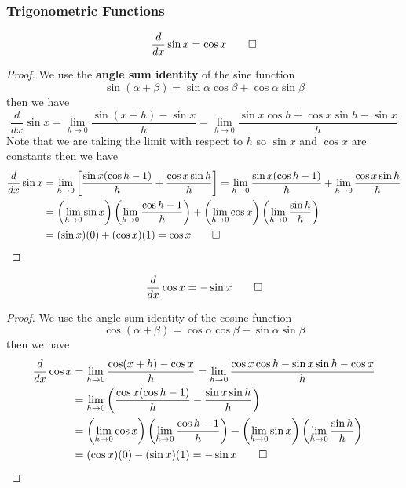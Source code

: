 \subsubsection{Trigonometric Functions}
\begin{theorem}
    \[\frac{d}{dx}\sin x=\cos x \qedhere\]
\end{theorem}
\begin{proof}
    We use the \textbf{angle sum identity} of the sine function
    \[\sin(\alpha+\beta)=\sin\alpha\cos\beta+\cos\alpha\sin\beta\]
    then we have
    \[\frac{d}{dx}\sin x=\lim_{h\to 0}\frac{\sin(x+h)-\sin x}{h}
    =\lim_{h\to 0}\frac{\sin x\cos h+\cos x\sin h-\sin x}{h}\]
    Note that we are taking the limit with respect to \(h\) so \(\sin x\) and
    \(\cos x\) are constants then we have
    \begin{align*}
        \frac{d}{dx}\sin x
        &= \lim_{h\to 0}\left[\frac{\sin x(\cos h-1)}{h}
        +\frac{\cos x\sin h}{h}\right]
        =\lim_{h\to 0}\frac{\sin x(\cos h-1)}{h}
        +\lim_{h\to 0}\frac{\cos x\sin h}{h}  \\
        &= \left(\lim_{h\to 0}\sin x\right)
        \left(\lim_{h\to 0}\frac{\cos h-1}{h}\right)
        +\left(\lim_{h\to 0}\cos x\right)
        \left(\lim_{h\to 0}\frac{\sin h}{h}\right)  \\
        &= (\sin x)(0)+(\cos x)(1) =\cos x \qedhere
    \end{align*}
\end{proof}
\begin{theorem}
    \[\frac{d}{dx}\cos x=-\sin x \qedhere\]
\end{theorem}
\begin{proof}
    We use the angle sum identity of the cosine function
    \[\cos(\alpha+\beta)=\cos\alpha\cos\beta-\sin\alpha\sin\beta\]
    then we have
    \begin{align*}
        \frac{d}{dx}\cos x
        &= \lim_{h\to 0}\frac{\cos(x+h)-\cos x}{h}
        =\lim_{h\to 0}\frac{\cos x\cos h-\sin x\sin h-\cos x}{h}  \\
        &= \lim_{h\to 0}\left(\frac{\cos x(\cos h-1)}{h}
        -\frac{\sin x\sin h}{h}\right)  \\
        &= \left(\lim_{h\to 0}\cos x\right)
        \left(\lim_{h\to 0}\frac{\cos h-1}{h}\right)
        -\left(\lim_{h\to 0}\sin x\right)
        \left(\lim_{h\to 0}\frac{\sin h}{h}\right)  \\
        &= (\cos x)(0)-(\sin x)(1)=-\sin x \qedhere
    \end{align*}
\end{proof}
